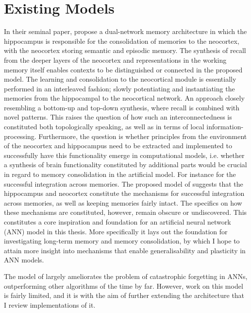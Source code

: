\section{Existing Models}\label{chpt:existing-models}

In their seminal paper, \cite{McClelland1995} propose a dual-network memory architecture in which the hippocampus is responsible for the consolidation of memories to the neocortex, with the neocortex storing semantic and episodic memory. The synthesis of recall from the deeper layers of the neocortex and representations in the working memory itself enables contexts to be distinguished or connected in the proposed model. The learning and consolidation to the neocortical module is essentially performed in an interleaved fashion; slowly potentiating and instantiating the memories from the hippocampal to the neocortical network. An approach closely resembling a bottom-up and top-down synthesis, where recall is combined with novel patterns. This raises the question of how such an interconnectedness is constituted both topologically speaking, as well as in terms of local information-processing. Furthermore, the question is whether principles from the environment of the neocortex and hippocampus need to be extracted and implemented to successfully have this functionality emerge in computational models, i.e. whether a synthesis of brain functionality constituted by additional parts would be crucial in regard to memory consolidation in the artificial model. For instance for the successful integration across memories. The proposed model of \citep{McClelland1995} suggests that the hippocampus and neocortex constitute the mechanisms for successful integration across memories, as well as keeping memories fairly intact. The specifics on how these mechanisms are constituted, however, remain obscure or undiscovered. This constitutes a core inspiration and foundation for an artificial neural network (ANN) model in this thesis. More specifically it lays out the foundation for investigating long-term memory and memory consolidation, by which I hope to attain more insight into mechanisms that enable generalisability and plasticity in ANN models.

The model of \cite{McClelland1995} largely ameliorates the problem of catastrophic forgetting in ANNs, outperforming other algorithms of the time by far. However, work on this model is fairly limited, and it is with the aim of further extending the architecture that I review implementations of it.

